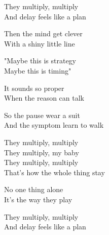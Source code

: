 \begin{lyrics}
They multiply, multiply\\
And delay feels like a plan

Then the mind get clever\\
With a shiny little line

"Maybe this is strategy\\
Maybe this is timing"

It sounds so proper\\
When the reason can talk

So the pause wear a suit\\
And the symptom learn to walk

They multiply, multiply\\
They multiply, my baby\\
They multiply, multiply\\
That's how the whole thing stay

No one thing alone\\
It's the way they play

They multiply, multiply\\
And delay feels like a plan
\end{lyrics}

